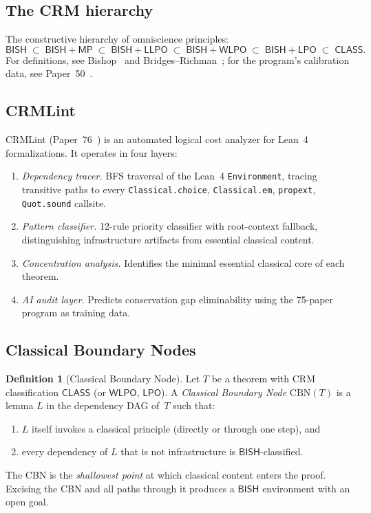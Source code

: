 \documentclass[11pt]{article}
\theoremstyle{plain}
\theoremstyle{definition}
\newtheorem{definition}[theorem]{Definition}
\theoremstyle{remark}
\newcommand{\BISH}{\mathsf{BISH}}
\newcommand{\LPO}{\mathsf{LPO}}
\newcommand{\WLPO}{\mathsf{WLPO}}
\newcommand{\LLPO}{\mathsf{LLPO}}
\newcommand{\MP}{\mathsf{MP}}
\newcommand{\CLASS}{\mathsf{CLASS}}
\newcommand{\CBN}{\mathrm{CBN}} %
\begin{document}
\subsection{The CRM hierarchy}

The constructive hierarchy of omniscience principles:
\[
  \BISH \;\subset\; \BISH{+}\MP \;\subset\; \BISH{+}\LLPO
  \;\subset\; \BISH{+}\WLPO \;\subset\; \BISH{+}\LPO
  \;\subset\; \CLASS.
\]
For definitions, see Bishop~\cite{Bishop1967} and
Bridges--Richman~\cite{BridgeRichman1987}; for the program's
calibration data, see Paper~50~\cite{Paper50}.

\subsection{CRMLint}

CRMLint (Paper~76~\cite{Paper76}) is an automated logical cost
analyzer for Lean~4 formalizations.  It operates in four layers:

\begin{enumerate}[nosep]
\item \emph{Dependency tracer.} BFS traversal of the Lean~4
  \texttt{Environment}, tracing transitive paths to every
  \texttt{Classical.choice}, \texttt{Classical.em},
  \texttt{propext}, \texttt{Quot.sound} callsite.
\item \emph{Pattern classifier.} 12-rule priority classifier
  with root-context fallback, distinguishing infrastructure
  artifacts from essential classical content.
\item \emph{Concentration analysis.} Identifies the minimal
  essential classical core of each theorem.
\item \emph{AI audit layer.} Predicts conservation gap
  eliminability using the 75-paper program as training data.
\end{enumerate}

\subsection{Classical Boundary Nodes}

\begin{definition}[Classical Boundary Node]\label{def:cbn}
Let $T$ be a theorem with CRM classification $\CLASS$ (or
$\WLPO$, $\LPO$).  A \emph{Classical Boundary Node}
$\CBN(T)$ is a lemma $L$ in the dependency DAG of~$T$ such that:
\begin{enumerate}[nosep]
\item $L$ itself invokes a classical principle (directly or
  through one step), and
\item every dependency of $L$ that is not infrastructure is
  $\BISH$-classified.
\end{enumerate}
The CBN is the \emph{shallowest point} at which classical content
enters the proof.  Excising the CBN and all paths through it
produces a $\BISH$ environment with an open goal.
\end{definition}
\end{document}

